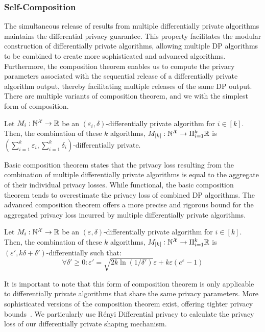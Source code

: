 \subsubsection{Self-Composition}\label{subsubsec:background-dp-composition}
The simultaneous release of results from multiple differentially private algorithms maintains the differential privacy guarantee.
This property facilitates the modular construction of differentially private algorithms, allowing multiple DP algorithms to be combined to create more sophisticated and advanced algorithms.
Furthermore, the composition theorem enables us to compute the privacy parameters associated with the sequential release of a differentially private algorithm output, thereby facilitating multiple releases of the same DP output.
There are multiple variants of composition theorem, and we with the simplest form of composition.
\begin{proposition}
\label{prop:basic-composition}
  Let $M_i: \mathbb{N}^\mathcal{X} \rightarrow \mathbb{R}$ be an $(\varepsilon_i, \delta)$-differentially private algorithm for $i \in [k]$. Then, the combination of these $k$ algorithms, $M_{[k]}: \mathbb{N}^\mathcal{X} \rightarrow \Pi_{i=1}^{k}\mathbb{R}$ is $(\sum_{i=1}^{k}\varepsilon_i, \sum_{i=1}^{k}\delta_i)$-differentially private.  
\end{proposition}
Basic composition theorem states that the privacy loss resulting from the combination of multiple differentially private algorithms is equal to the aggregate of their individual privacy losses.
While functional, the basic composition theorem tends to overestimate the privacy loss of combined DP algorithms.
The advanced composition theorem offers a more precise and rigorous bound for the aggregated privacy loss incurred by multiple differentially private algorithms. 
\begin{proposition}
\label{prop:advanced-composition}
  Let $M_i: \mathbb{N}^\mathcal{X} \rightarrow \mathbb{R}$ be an $(\varepsilon, \delta)$-differentially private algorithm for $i \in [k]$. Then, the combination of these $k$ algorithms, $M_{[k]}: \mathbb{N}^\mathcal{X} \rightarrow \Pi_{i=1}^{k}\mathbb{R}$ is $(\varepsilon', k\delta+\delta')$-differentially such that:
  \begin{equation*}
    \forall \delta' \geq 0: \varepsilon' = \sqrt{2k\ln(1/\delta')}\varepsilon + k\varepsilon(e^{\varepsilon} - 1)
  \end{equation*}
\end{proposition}
It is important to note that this form of composition theorem is only applicable to differentially private algorithms that share the same privacy parameters.
More sophisticated versions of the composition theorem exist, offering tighter privacy bounds~\cite{kairouz2015composition, mironov2017renyi}.
We particularly use R{\'e}nyi Differential privacy to calculate the privacy loss of our differentially private shaping mechanism.

